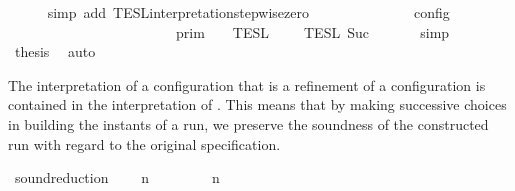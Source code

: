 \begin{isabellebody}
\ \ \ \ \isamarkupfalse%
\ {\isacharparenleft}simp\ add{\isacharcolon}\ TESL{\isacharunderscore}interpretation{\isacharunderscore}stepwise{\isacharunderscore}zero{\isacharprime}{\isacharparenright}\isanewline
\ \ \ \ \isamarkupfalse%
\ \isamarkupfalse%
\ {\isacartoucheopen}{\isasymlbrakk}\ {\isacharbrackleft}{\isacharbrackright}{\isacharcomma}\ {}\ {\isasymturnstile}\ {\isasymPsi}\ {\isasymtriangleright}\ {\isacharbrackleft}{\isacharbrackright}\ {\isasymrbrakk}\isactrlsub c\isactrlsub o\isactrlsub n\isactrlsub f\isactrlsub i\isactrlsub g\ {\isacharequal}\isanewline
\ \ \ \ \ \ \ \ \ \ \ \ \ \ \ \ \ \ \ \ \ \ {\isasymlbrakk}{\isasymlbrakk}\ {\isacharbrackleft}{\isacharbrackright}\ {\isasymrbrakk}{\isasymrbrakk}\isactrlsub p\isactrlsub r\isactrlsub i\isactrlsub m\ {\isasyminter}\ {\isasymlbrakk}{\isasymlbrakk}\ {\isasymPsi}\ {\isasymrbrakk}{\isasymrbrakk}\isactrlsub T\isactrlsub E\isactrlsub S\isactrlsub L\isactrlbsup {\isasymge}\ {}\isactrlesup \ {\isasyminter}\ {\isasymlbrakk}{\isasymlbrakk}\ {\isacharbrackleft}{\isacharbrackright}\ {\isasymrbrakk}{\isasymrbrakk}\isactrlsub T\isactrlsub E\isactrlsub S\isactrlsub L\isactrlbsup {\isasymge}\ Suc\ {}\isactrlesup {\isacartoucheclose}\isanewline
\ \ \ \ \isamarkupfalse%
\ simp\isanewline
\ \ \ \ \isamarkupfalse%
\ \isamarkupfalse%
\ {\isacharquery}thesis\ \isamarkupfalse%
\ auto\isanewline
\ \ \isamarkupfalse%
%
\endisatagproof
{\isafoldproof}%
%
\isadelimproof
%
\endisadelimproof
%
\isadelimdocument
%
\endisadelimdocument
%
\isatagdocument
%
\isamarkuptrue%
%
\endisatagdocument
{\isafolddocument}%
%
\isadelimdocument
%
\endisadelimdocument
%
\begin{isamarkuptext}%
The interpretation of a configuration  that is a refinement of a
  configuration  is contained in the interpretation of .
  This means that by making successive choices in building the instants of a run,
  we preserve the soundness of the constructed run with regard to the original 
  specification.%
\end{isamarkuptext}\isamarkuptrue%
\isamarkupfalse%
\ sound{\isacharunderscore}reduction{\isacharcolon}\isanewline
\ \ \ {\isacartoucheopen}{\isacharparenleft}{\isasymGamma}\ n\ {\isasymturnstile}\ {\isasymPsi}\ {\isasymtriangleright}\ {\isasymPhi}\ \ {\isasymhookrightarrow}\ \ {\isacharparenleft}{\isasymGamma}\ n\ {\isasymturnstile}\ {\isasymPsi}\ {\isasymtriangleright}\ {\isasymPhi}\isanewline

\end{isabellebody}
